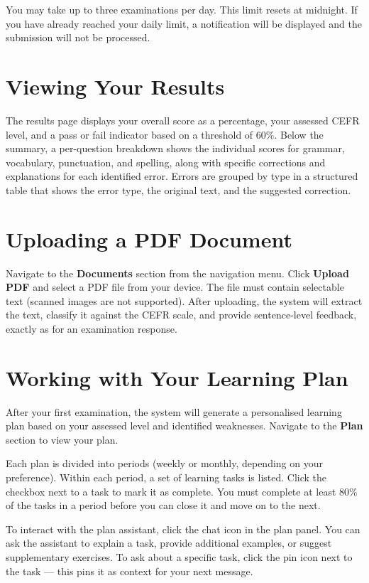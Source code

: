 \documentclass[12pt, a4paper]{report}
\begin{document}
You may take up to three examinations per day. This limit resets at midnight. If you have already reached your daily limit, a notification will be displayed and the submission will not be processed.

\section{Viewing Your Results}

The results page displays your overall score as a percentage, your assessed CEFR level, and a pass or fail indicator based on a threshold of 60\%. Below the summary, a per-question breakdown shows the individual scores for grammar, vocabulary, punctuation, and spelling, along with specific corrections and explanations for each identified error. Errors are grouped by type in a structured table that shows the error type, the original text, and the suggested correction.

\section{Uploading a PDF Document}

Navigate to the \textbf{Documents} section from the navigation menu. Click \textbf{Upload PDF} and select a PDF file from your device. The file must contain selectable text (scanned images are not supported). After uploading, the system will extract the text, classify it against the CEFR scale, and provide sentence-level feedback, exactly as for an examination response.

\section{Working with Your Learning Plan}

After your first examination, the system will generate a personalised learning plan based on your assessed level and identified weaknesses. Navigate to the \textbf{Plan} section to view your plan.

Each plan is divided into periods (weekly or monthly, depending on your preference). Within each period, a set of learning tasks is listed. Click the checkbox next to a task to mark it as complete. You must complete at least 80\% of the tasks in a period before you can close it and move on to the next.

To interact with the plan assistant, click the chat icon in the plan panel. You can ask the assistant to explain a task, provide additional examples, or suggest supplementary exercises. To ask about a specific task, click the pin icon next to the task — this pins it as context for your next message.
\end{document}
